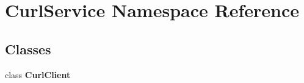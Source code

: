 \section{Curl\+Service Namespace Reference}
\label{namespaceCurlService}
\subsection*{Classes}
\begin{DoxyCompactItemize}
\item 
class {\bf Curl\+Client}
\end{DoxyCompactItemize}
